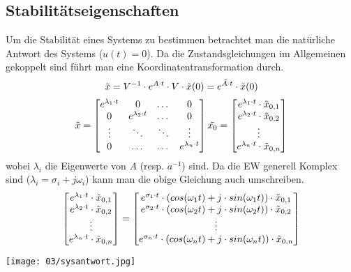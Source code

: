     \subsection{Stabilitätseigenschaften}
        Um die Stabilität eines Systems zu bestimmen betrachtet man die natürliche Antwort des Systems ($u(t)=0$). Da die Zustandsgleichungen im Allgemeinen gekoppelt sind führt man eine Koordinatentransformation durch.
        \[\Tilde{x}=V^{-1}\cdot e^{A\cdot t}\cdot V \cdot\Tilde{x}(0)=e^{\Tilde{A}\cdot t}\cdot\Tilde{x}(0)\]
        \[\Tilde{x}=
        \begin{bmatrix}
            e^{\lambda_1\cdot t}    & 0                     & \dots & 0 \\
            0                       & e^{\lambda_2\cdot t}  & \dots & 0 \\
            \vdots                  & \ddots                & \ddots & \vdots\\
            0                       & \dots    &\dots             & e^{\lambda_n\cdot t}
        \end{bmatrix}
        \Tilde{x_0}=
        \begin{bmatrix}
            e^{\lambda_1\cdot t}\cdot\Tilde{x}_{0,1}  \\
            e^{\lambda_2\cdot t}\cdot\Tilde{x}_{0,2} \\
            \vdots  \\
            e^{\lambda_n\cdot t}\cdot\Tilde{x}_{0,n} 
        \end{bmatrix}
        \]
        wobei $\lambda_i$ die Eigenwerte von $A$ (resp. $a^{-1}$) sind. Da die EW generell Komplex sind ($\lambda_i=\sigma_i+j\omega_i$) kann man die obige Gleichung auch umschreiben.
        \[
        \begin{bmatrix}
            e^{\lambda_1\cdot t}\cdot\Tilde{x}_{0,1}  \\
            e^{\lambda_2\cdot t}\cdot\Tilde{x}_{0,2} \\
            \vdots  \\
            e^{\lambda_n\cdot t}\cdot\Tilde{x}_{0,n} 
        \end{bmatrix}
        =
        \begin{bmatrix}
            e^{\sigma_1\cdot t}\cdot\left(cos(\omega_1t)+j\cdot sin(\omega_1t)\right)\cdot\Tilde{x}_{0,1}  \\
            e^{\sigma_2\cdot t}\cdot\left(cos(\omega_2t)+j\cdot sin(\omega_2t)\right)\cdot\Tilde{x}_{0,2} \\
            \vdots  \\
            e^{\sigma_n\cdot t}\cdot\left(cos(\omega_nt)+j\cdot sin(\omega_nt)\right)\cdot\Tilde{x}_{0,n} 
        \end{bmatrix}
        \]
        \begin{center}
            \texttt{[image: 03/sysantwort.jpg]}
        \end{center}
        
